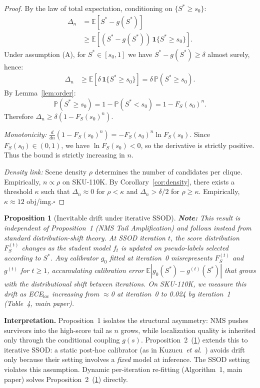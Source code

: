 \documentclass[10pt,twocolumn,letterpaper]{article}
\newtheorem{proposition}{Proposition}
\newcommand{\sku}{\textsc{SKU-110K}}
\def\etal{\emph{et al.}}
\begin{document}
\begin{proof}
By the law of total expectation, conditioning on $\{S^*\ge s_0\}$:
\begin{align}
\Delta_n &= \mathbb{E}[S^*-g(S^*)] \nonumber \\
         &\ge \mathbb{E}\!\left[(S^*-g(S^*))\,\mathbf{1}\{S^*\ge s_0\}\right]. \nonumber
\end{align}
Under assumption (A), for $S^*\in[s_0,1]$ we have $S^*-g(S^*)\ge\delta$
almost surely, hence:
\begin{align}
\Delta_n &\ge \mathbb{E}\!\left[\delta\,\mathbf{1}\{S^*\ge s_0\}\right]
          = \delta\,\mathbb{P}(S^*\ge s_0). \nonumber
\end{align}
By Lemma~\ref{lem:order}:
\[
\mathbb{P}(S^*\ge s_0) = 1 - \mathbb{P}(S^*<s_0) = 1 - F_S(s_0)^n.
\]
Therefore $\Delta_n \ge \delta(1-F_S(s_0)^n)$.

\textit{Monotonicity:} $\frac{d}{dn}(1-F_S(s_0)^n)=-F_S(s_0)^n\ln F_S(s_0)$.
Since $F_S(s_0)\in(0,1)$, we have $\ln F_S(s_0)<0$, so the derivative is
strictly positive. Thus the bound is strictly increasing in $n$.

\textit{Density link:} Scene density $\rho$ determines the number of candidates
per clique. Empirically, $n\propto\rho$ on \sku. By Corollary~\ref{cor:density},
there exists a threshold $\kappa$ such that $\Delta_n\approx0$ for $\rho<\kappa$
and $\Delta_n>\delta/2$ for $\rho\ge\kappa$. Empirically, $\kappa\approx12$
obj/img.\hfill$\square$
\end{proof}

\begin{proposition}[Inevitable drift under iterative SSOD]
\label{prop:drift}
\textbf{Note:} This result is independent of Proposition~1 (NMS Tail
Amplification) and follows instead from standard distribution-shift theory.
At SSOD iteration $t$, the score distribution $F_S^{(t)}$ changes as the student
model $f_t$ is updated on pseudo-labels selected according to $S^*$. Any
calibrator $g_0$ fitted at iteration~0 misrepresents $F_S^{(t)}$ and $g^{(t)}$
for $t\ge1$, accumulating calibration error $\mathbb{E}|g_0(S^*)-g^{(t)}(S^*)|$
that grows with the distributional shift between iterations. On \sku,
we measure this drift as ECE$_\text{loc}$ increasing from $\approx$0 at
iteration~0 to 0.024 by iteration~1 (Table~4, main paper).
\end{proposition}

\textbf{Interpretation.}
Proposition~1 isolates the structural asymmetry: NMS pushes survivors into the
high-score tail as $n$ grows, while localization quality is inherited only
through the conditional coupling $g(s)$. Proposition~2~(\ref{prop:drift}) extends this
to iterative SSOD: a static post-hoc calibrator (as in
Kuzucu~\etal~\cite{kuzucu2024calibration}) avoids drift only because their
setting involves a \emph{fixed} model at inference. The SSOD setting violates
this assumption. Dynamic per-iteration re-fitting (Algorithm~1, main paper)
solves Proposition~2~(\ref{prop:drift}) directly.
\end{document}
